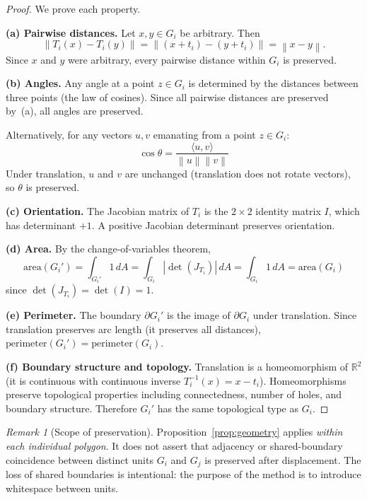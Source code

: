 \documentclass[12pt, a4paper]{article}
\numberwithin{equation}{section}
\theoremstyle{definition}
\theoremstyle{plain}
\theoremstyle{remark}
\newtheorem*{remark}{Remark}
\newcommand{\R}{\mathbb{R}}
\newcommand{\norm}[1]{\left\|#1\right\|}
\newcommand{\inner}[2]{\langle #1, #2 \rangle}
\begin{document}
\begin{proof}
We prove each property.

\medskip\noindent\textbf{(a) Pairwise distances.}
Let $x, y \in G_i$ be arbitrary. Then
\begin{equation}
  \norm{T_i(x) - T_i(y)} = \norm{(x + t_i) - (y + t_i)} = \norm{x - y}.
  \label{eq:isometry}
\end{equation}
Since $x$ and $y$ were arbitrary, every pairwise distance within $G_i$ is preserved.

\medskip\noindent\textbf{(b) Angles.}
Any angle at a point $z \in G_i$ is determined by the distances between three points (the law of cosines). Since all pairwise distances are preserved by~(a), all angles are preserved.

Alternatively, for any vectors $u, v$ emanating from a point $z \in G_i$:
\[
  \cos\theta = \frac{\inner{u}{v}}{\norm{u}\norm{v}}
\]
Under translation, $u$ and $v$ are unchanged (translation does not rotate vectors), so $\theta$ is preserved.

\medskip\noindent\textbf{(c) Orientation.}
The Jacobian matrix of $T_i$ is the $2 \times 2$ identity matrix $I$, which has determinant $+1$. A positive Jacobian determinant preserves orientation.

\medskip\noindent\textbf{(d) Area.}
By the change-of-variables theorem,
\[
  \mathrm{area}(G_i') = \int_{G_i'} 1\,dA = \int_{G_i} |\det(J_{T_i})|\,dA = \int_{G_i} 1\,dA = \mathrm{area}(G_i)
\]
since $\det(J_{T_i}) = \det(I) = 1$.

\medskip\noindent\textbf{(e) Perimeter.}
The boundary $\partial G_i'$ is the image of $\partial G_i$ under translation. Since translation preserves arc length (it preserves all distances), $\mathrm{perimeter}(G_i') = \mathrm{perimeter}(G_i)$.

\medskip\noindent\textbf{(f) Boundary structure and topology.}
Translation is a homeomorphism of $\R^2$ (it is continuous with continuous inverse $T_i^{-1}(x) = x - t_i$). Homeomorphisms preserve topological properties including connectedness, number of holes, and boundary structure. Therefore $G_i'$ has the same topological type as $G_i$.
\end{proof}

\begin{remark}[Scope of preservation]
Proposition~\ref{prop:geometry} applies \emph{within each individual polygon}. It does not assert that adjacency or shared-boundary coincidence between distinct units $G_i$ and $G_j$ is preserved after displacement. The loss of shared boundaries is intentional: the purpose of the method is to introduce whitespace between units.
\end{remark}
\end{document}
